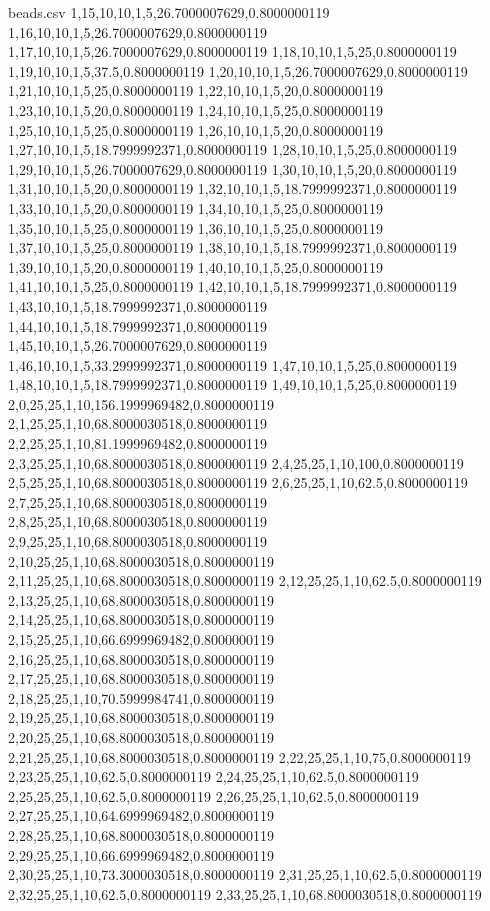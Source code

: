 \begin{filecontents*}{beads.csv}
1,15,10,10,1,5,26.7000007629,0.8000000119
1,16,10,10,1,5,26.7000007629,0.8000000119
1,17,10,10,1,5,26.7000007629,0.8000000119
1,18,10,10,1,5,25,0.8000000119
1,19,10,10,1,5,37.5,0.8000000119
1,20,10,10,1,5,26.7000007629,0.8000000119
1,21,10,10,1,5,25,0.8000000119
1,22,10,10,1,5,20,0.8000000119
1,23,10,10,1,5,20,0.8000000119
1,24,10,10,1,5,25,0.8000000119
1,25,10,10,1,5,25,0.8000000119
1,26,10,10,1,5,20,0.8000000119
1,27,10,10,1,5,18.7999992371,0.8000000119
1,28,10,10,1,5,25,0.8000000119
1,29,10,10,1,5,26.7000007629,0.8000000119
1,30,10,10,1,5,20,0.8000000119
1,31,10,10,1,5,20,0.8000000119
1,32,10,10,1,5,18.7999992371,0.8000000119
1,33,10,10,1,5,20,0.8000000119
1,34,10,10,1,5,25,0.8000000119
1,35,10,10,1,5,25,0.8000000119
1,36,10,10,1,5,25,0.8000000119
1,37,10,10,1,5,25,0.8000000119
1,38,10,10,1,5,18.7999992371,0.8000000119
1,39,10,10,1,5,20,0.8000000119
1,40,10,10,1,5,25,0.8000000119
1,41,10,10,1,5,25,0.8000000119
1,42,10,10,1,5,18.7999992371,0.8000000119
1,43,10,10,1,5,18.7999992371,0.8000000119
1,44,10,10,1,5,18.7999992371,0.8000000119
1,45,10,10,1,5,26.7000007629,0.8000000119
1,46,10,10,1,5,33.2999992371,0.8000000119
1,47,10,10,1,5,25,0.8000000119
1,48,10,10,1,5,18.7999992371,0.8000000119
1,49,10,10,1,5,25,0.8000000119
2,0,25,25,1,10,156.1999969482,0.8000000119
2,1,25,25,1,10,68.8000030518,0.8000000119
2,2,25,25,1,10,81.1999969482,0.8000000119
2,3,25,25,1,10,68.8000030518,0.8000000119
2,4,25,25,1,10,100,0.8000000119
2,5,25,25,1,10,68.8000030518,0.8000000119
2,6,25,25,1,10,62.5,0.8000000119
2,7,25,25,1,10,68.8000030518,0.8000000119
2,8,25,25,1,10,68.8000030518,0.8000000119
2,9,25,25,1,10,68.8000030518,0.8000000119
2,10,25,25,1,10,68.8000030518,0.8000000119
2,11,25,25,1,10,68.8000030518,0.8000000119
2,12,25,25,1,10,62.5,0.8000000119
2,13,25,25,1,10,68.8000030518,0.8000000119
2,14,25,25,1,10,68.8000030518,0.8000000119
2,15,25,25,1,10,66.6999969482,0.8000000119
2,16,25,25,1,10,68.8000030518,0.8000000119
2,17,25,25,1,10,68.8000030518,0.8000000119
2,18,25,25,1,10,70.5999984741,0.8000000119
2,19,25,25,1,10,68.8000030518,0.8000000119
2,20,25,25,1,10,68.8000030518,0.8000000119
2,21,25,25,1,10,68.8000030518,0.8000000119
2,22,25,25,1,10,75,0.8000000119
2,23,25,25,1,10,62.5,0.8000000119
2,24,25,25,1,10,62.5,0.8000000119
2,25,25,25,1,10,62.5,0.8000000119
2,26,25,25,1,10,62.5,0.8000000119
2,27,25,25,1,10,64.6999969482,0.8000000119
2,28,25,25,1,10,68.8000030518,0.8000000119
2,29,25,25,1,10,66.6999969482,0.8000000119
2,30,25,25,1,10,73.3000030518,0.8000000119
2,31,25,25,1,10,62.5,0.8000000119
2,32,25,25,1,10,62.5,0.8000000119
2,33,25,25,1,10,68.8000030518,0.8000000119

\end{filecontents*}
